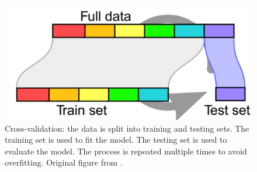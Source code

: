 \documentclass[french,12pt,twoside,a4paper]{book}
\begin{document}
\begin{figure}[!h]
  \centering
  \includegraphics[width=0.8\linewidth]{img/chapter_1/cross_validation.png}
  \caption{Cross-validation: the data is split into training and testing sets.
    The training set is used to fit the model. The testing set is used to
    evaluate the model. The process is repeated multiple times to avoid
    overfitting. Original figure from \cite{varoquaux2017assessing}.}
  \label{fig:intro:cross_validation}
\end{figure}
\end{document}
